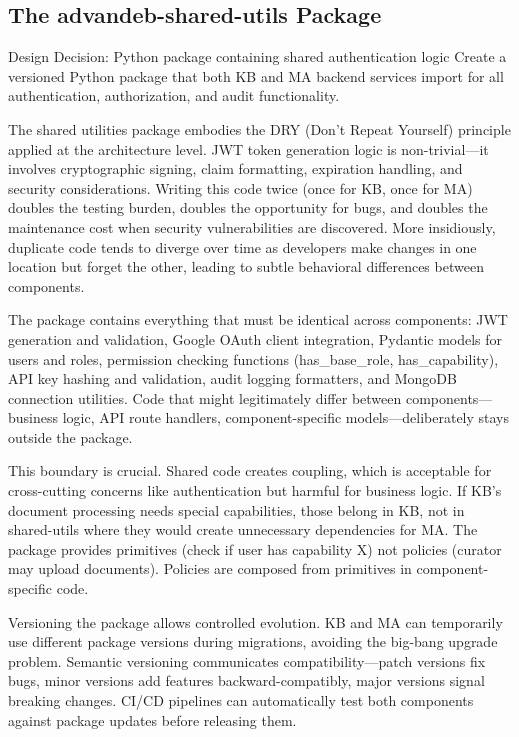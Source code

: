 \documentclass[12pt,a4paper]{article}
\begin{document}
\subsection{The advandeb-shared-utils Package}

\begin{rationale}{Design Decision: Python package containing shared authentication logic}
Create a versioned Python package that both KB and MA backend services import for all authentication, authorization, and audit functionality.
\end{rationale}

The shared utilities package embodies the DRY (Don't Repeat Yourself) principle applied at the architecture level. JWT token generation logic is non-trivial—it involves cryptographic signing, claim formatting, expiration handling, and security considerations. Writing this code twice (once for KB, once for MA) doubles the testing burden, doubles the opportunity for bugs, and doubles the maintenance cost when security vulnerabilities are discovered. More insidiously, duplicate code tends to diverge over time as developers make changes in one location but forget the other, leading to subtle behavioral differences between components.

The package contains everything that must be identical across components: JWT generation and validation, Google OAuth client integration, Pydantic models for users and roles, permission checking functions (has\_base\_role, has\_capability), API key hashing and validation, audit logging formatters, and MongoDB connection utilities. Code that might legitimately differ between components—business logic, API route handlers, component-specific models—deliberately stays outside the package.

This boundary is crucial. Shared code creates coupling, which is acceptable for cross-cutting concerns like authentication but harmful for business logic. If KB's document processing needs special capabilities, those belong in KB, not in shared-utils where they would create unnecessary dependencies for MA. The package provides primitives (check if user has capability X) not policies (curator may upload documents). Policies are composed from primitives in component-specific code.

Versioning the package allows controlled evolution. KB and MA can temporarily use different package versions during migrations, avoiding the big-bang upgrade problem. Semantic versioning communicates compatibility—patch versions fix bugs, minor versions add features backward-compatibly, major versions signal breaking changes. CI/CD pipelines can automatically test both components against package updates before releasing them.
\end{document}
